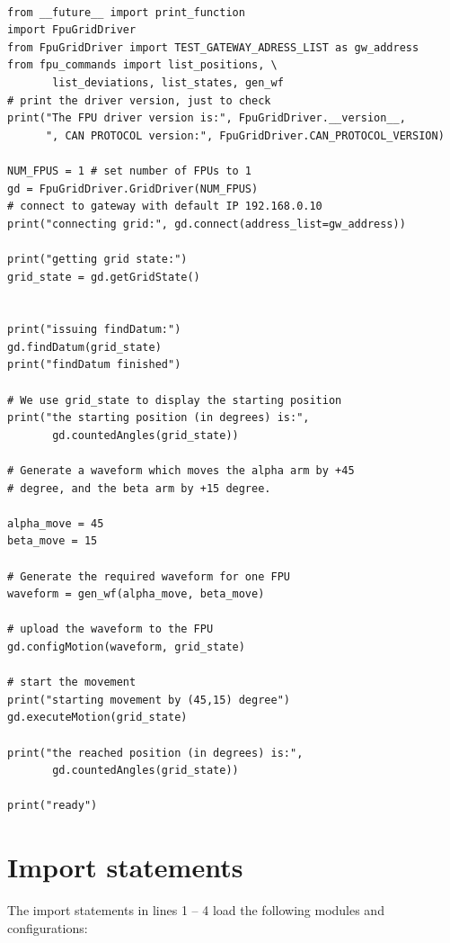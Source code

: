 \documentclass[fontsize=12,a4paper]{scrreprt}
\begin{document}
\begin{verbatim}

from __future__ import print_function
import FpuGridDriver
from FpuGridDriver import TEST_GATEWAY_ADRESS_LIST as gw_address
from fpu_commands import list_positions, \
       list_deviations, list_states, gen_wf
# print the driver version, just to check
print("The FPU driver version is:", FpuGridDriver.__version__,
      ", CAN PROTOCOL version:", FpuGridDriver.CAN_PROTOCOL_VERSION)

NUM_FPUS = 1 # set number of FPUs to 1
gd = FpuGridDriver.GridDriver(NUM_FPUS)
# connect to gateway with default IP 192.168.0.10
print("connecting grid:", gd.connect(address_list=gw_address))

print("getting grid state:")
grid_state = gd.getGridState()


print("issuing findDatum:")
gd.findDatum(grid_state)
print("findDatum finished")

# We use grid_state to display the starting position
print("the starting position (in degrees) is:",
       gd.countedAngles(grid_state))

# Generate a waveform which moves the alpha arm by +45
# degree, and the beta arm by +15 degree.

alpha_move = 45
beta_move = 15

# Generate the required waveform for one FPU
waveform = gen_wf(alpha_move, beta_move)

# upload the waveform to the FPU
gd.configMotion(waveform, grid_state)

# start the movement
print("starting movement by (45,15) degree")
gd.executeMotion(grid_state)

print("the reached position (in degrees) is:",
       gd.countedAngles(grid_state))

print("ready")

\end{verbatim}


\section{Import statements}

The import statements in lines 1 -- 4 load the following modules and
configurations:
\end{document}
